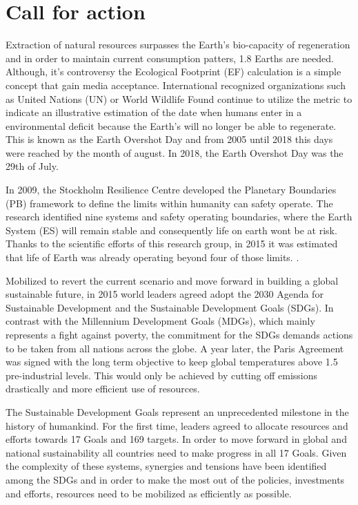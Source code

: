\section{Call for action}
Extraction of natural resources surpasses the Earth's bio-capacity of regeneration and in order to maintain current consumption patters, 1.8 Earths are needed. Although, it's controversy  \parencite{Blomqvist2013, Eading1999, Rees2013, Giampietro2014} the Ecological Footprint (EF) calculation is a simple concept that gain media acceptance. International recognized organizations such as United Nations (UN) or World Wildlife Found continue to utilize the metric to indicate an illustrative estimation of the date when humans enter in a environmental deficit because the Earth's will no longer be able to regenerate. This is known as the Earth Overshot Day and from 2005 until 2018 this days were reached by the month of august. In 2018, the Earth Overshot Day was the 29th of July. \par

In 2009, the Stockholm Resilience Centre developed the Planetary Boundaries (PB) framework to define the limits within humanity can safety operate. The research identified nine systems and safety operating boundaries, where the Earth System (ES) will remain stable and consequently life on earth wont be at risk. Thanks to the scientific efforts of this research group, in 2015 it was estimated that life of Earth was already operating beyond four of those limits. \parencite{Steffen2015}.\par

Mobilized to revert the current scenario and move forward in building a global sustainable future, in 2015 world leaders agreed adopt the 2030 Agenda for Sustainable Development and the Sustainable Development Goals (SDGs). In contrast with the  Millennium Development Goals (MDGs), which mainly represents a fight against poverty, the commitment for the SDGs demands actions to be taken from all nations across the globe. A year later, the Paris Agreement was signed with the long term objective to keep global temperatures above 1.5 pre-industrial levels. This would only be achieved by cutting off emissions drastically and more efficient use of resources. \par

The Sustainable Development Goals represent an unprecedented milestone in the history of humankind. For the first time, leaders agreed to allocate resources and efforts towards 17 Goals and 169 targets. In order to move forward in global and national sustainability all countries need to make progress in all 17 Goals. Given the complexity of these systems, synergies and tensions have been identified among the SDGs and in order to make the most out of the policies, investments and efforts, resources need to be mobilized as efficiently as possible. \par

